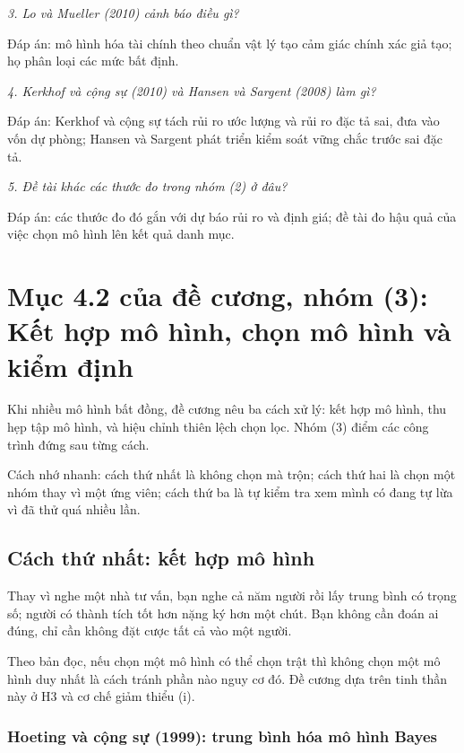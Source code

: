 {\itshape 3. Lo và Mueller (2010) cảnh báo điều gì?\par}

Đáp án: mô hình hóa tài chính theo chuẩn vật lý tạo cảm giác chính xác giả tạo; họ phân loại các mức bất định.

{\itshape 4. Kerkhof và cộng sự (2010) và Hansen và Sargent (2008) làm gì?\par}

Đáp án: Kerkhof và cộng sự tách rủi ro ước lượng và rủi ro đặc tả sai, đưa vào vốn dự phòng; Hansen và Sargent phát triển kiểm soát vững chắc trước sai đặc tả.

{\itshape 5. Đề tài khác các thước đo trong nhóm (2) ở đâu?\par}

Đáp án: các thước đo đó gắn với dự báo rủi ro và định giá; đề tài đo hậu quả của việc chọn mô hình lên kết quả danh mục.

\chapter{Mục 4.2 của đề cương, nhóm (3): Kết hợp mô hình, chọn mô hình và kiểm định}

Khi nhiều mô hình bất đồng, đề cương nêu ba cách xử lý: kết hợp mô hình, thu hẹp tập mô hình, và hiệu chỉnh thiên lệch chọn lọc. Nhóm (3) điểm các công trình đứng sau từng cách.

Cách nhớ nhanh: cách thứ nhất là không chọn mà trộn; cách thứ hai là chọn một nhóm thay vì một ứng viên; cách thứ ba là tự kiểm tra xem mình có đang tự lừa vì đã thử quá nhiều lần.

\section{Cách thứ nhất: kết hợp mô hình}

Thay vì nghe một nhà tư vấn, bạn nghe cả năm người rồi lấy trung bình có trọng số; người có thành tích tốt hơn nặng ký hơn một chút. Bạn không cần đoán ai đúng, chỉ cần không đặt cược tất cả vào một người.

Theo bản đọc, nếu chọn một mô hình có thể chọn trật thì không chọn một mô hình duy nhất là cách tránh phần nào nguy cơ đó. Đề cương dựa trên tinh thần này ở H3 và cơ chế giảm thiểu (i).

\subsection{Hoeting và cộng sự (1999): trung bình hóa mô hình Bayes}

